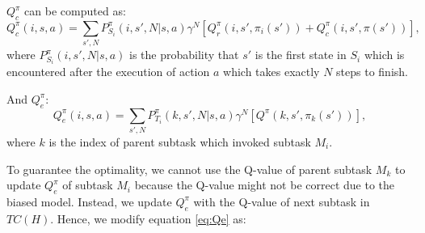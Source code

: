 $Q_c^{\pi}$ can be computed as:
\begin{equation}
    Q_c^{\pi}(i, s, a) = \sum_{s', N} P_{S_i}^{\pi}(i, s', N|s, a)\gamma^N[Q_r^{\pi}(i, s', \pi_i(s')) + Q_c^{\pi}(i, s', \pi(s'))],
    \label{eq:Qc}
\end{equation}
where $P_{S_i}^{\pi}(i, s', N|s, a)$ is the probability that $s'$ is the first state in $S_i$ which
is encountered after the execution of action $a$ which takes exactly $N$ steps to finish. 

And $Q_e^{\pi}$:
\begin{equation}
    Q_e^{\pi}(i, s, a) = \sum_{s', N} P_{T_i}^{\pi}(k, s', N|s, a)\gamma^N[Q^{\pi}(k, s', \pi_k(s'))],
    \label{eq:Qe}
\end{equation}
where $k$ is the index of parent subtask which invoked subtask $M_i$.

To guarantee the optimality, we cannot use the Q-value of parent subtask $M_k$ to update $Q_e^{\pi}$ of subtask $M_i$ because the 
Q-value might not be correct due to the biased model.  Instead, 
we update $Q_e^{\pi}$ with the Q-value of next subtask in $TC(H)$.
Hence, we modify equation \ref{eq:Qe} as:

